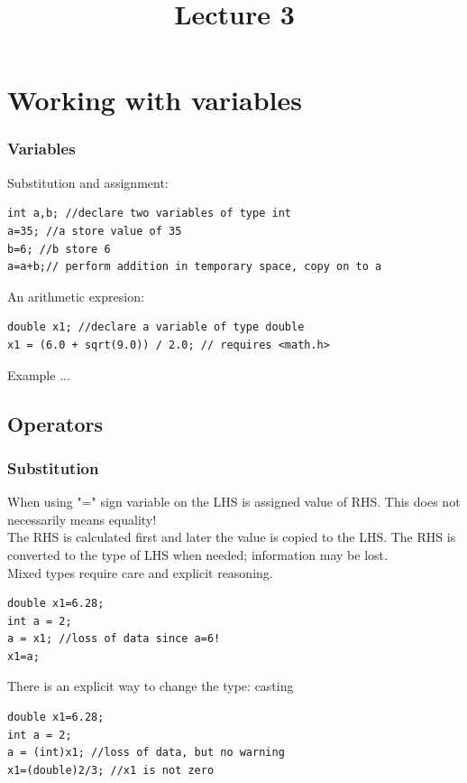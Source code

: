 \documentclass[10pt]{beamer}
\title{Lecture 3}
\date{}
\begin{document}
\frame{
    \titlepage
}


\section{Working with variables}

\begin{frame}[fragile]
  \frametitle{Variables}
  \centering
Substitution and assignment:
    \begin{lstlisting}
int a,b; //declare two variables of type int
a=35; //a store value of 35
b=6; //b store 6
a=a+b;// perform addition in temporary space, copy on to a
    \end{lstlisting}

An arithmetic expresion:
    \begin{lstlisting}
double x1; //declare a variable of type double
x1 = (6.0 + sqrt(9.0)) / 2.0; // requires <math.h>
    \end{lstlisting}

Example ...

\end{frame}

\subsection{Operators}

\begin{frame}[fragile]
  \frametitle{Substitution}
  \centering
  When using "=" sign variable on the LHS is assigned value of RHS. This does not necessarily means equality!\\
  The RHS is calculated first and later the value is copied to the LHS. The RHS is converted to the type of LHS when needed; information may be lost.\\
  Mixed types require care and explicit reasoning.\\
\begin{lstlisting}
double x1=6.28;
int a = 2;
a = x1; //loss of data since a=6!
x1=a;
\end{lstlisting}
There is an explicit way to change the type: casting
\begin{lstlisting}
double x1=6.28;
int a = 2;
a = (int)x1; //loss of data, but no warning
x1=(double)2/3; //x1 is not zero
\end{lstlisting}


\end{frame}
\end{document}
